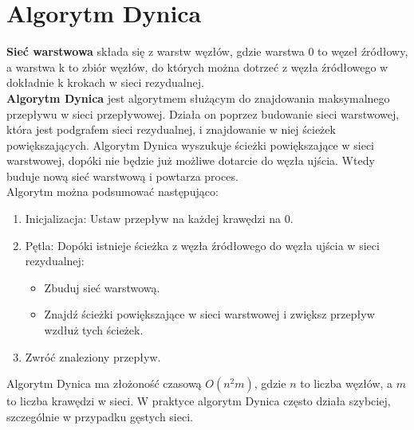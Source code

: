 \documentclass{article}
\begin{document}
\section*{Algorytm Dynica}
\textbf{Sieć warstwowa} składa się z warstw węzłów, gdzie warstwa 0 to węzeł źródłowy, a warstwa k to zbiór węzłów, do których można dotrzeć z węzła źródłowego w dokładnie k krokach w sieci rezydualnej.\\
\textbf{Algorytm Dynica} jest algorytmem służącym do znajdowania maksymalnego przepływu w sieci przepływowej. Działa on poprzez budowanie sieci warstwowej, która jest podgrafem sieci rezydualnej, i znajdowanie w niej ścieżek powiększających. Algorytm Dynica wyszukuje ścieżki powiększające w sieci warstwowej, dopóki nie będzie już możliwe dotarcie do węzła ujścia. Wtedy buduje nową sieć warstwową i powtarza proces.\\
Algorytm można podsumować następująco:
\begin{enumerate}
\item Inicjalizacja: Ustaw przepływ na każdej krawędzi na 0.
\item Pętla: Dopóki istnieje ścieżka z węzła źródłowego do węzła ujścia w sieci rezydualnej:
\begin{itemize}
\item Zbuduj sieć warstwową.
\item Znajdź ścieżki powiększające w sieci warstwowej i zwiększ przepływ wzdłuż tych ścieżek.
\end{itemize}
\item Zwróć znaleziony przepływ.
\end{enumerate}
Algorytm Dynica ma złożoność czasową $O(n^2m)$, gdzie $n$ to liczba węzłów, a $m$ to liczba krawędzi w sieci. W praktyce algorytm Dynica często działa szybciej, szczególnie w przypadku gęstych sieci.
\end{document}
